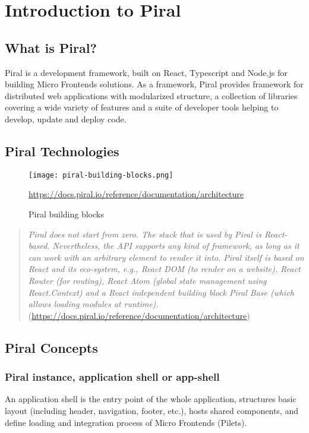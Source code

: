 \documentclass[a4paper]{book}
\begin{document}
\section{Introduction to Piral } \label{Introduction to Piral}
\subsection{What is Piral?}
Piral is a development framework, built on React, Typescript and Node.js for building Micro Frontends solutions. As a framework, Piral provides framework for distributed web applications with modularized structure, a collection of libraries covering a wide variety of features and a suite of developer tools helping to develop, update and deploy code.

\subsection{Piral Technologies}

\begin{figure}[h!]
  \centering
  \captionsetup{justification=centering}
  \texttt{[image: piral-building-blocks.png]}
  \caption{Piral building blocks}
  \url{https://docs.piral.io/reference/documentation/architecture}
  \label{fig:piral-standard}
\end{figure}

\begin{quote}
\textit{
    Piral does not start from zero. The stack that is used by Piral is React-based. Nevertheless, the API supports any kind of framework, as long as it can work with an arbitrary element to render it into. Piral itself is based on React and its eco-system, e.g., React DOM (to render on a website), React Router (for routing), React Atom (global state management using React.Context) and a React independent building block Piral Base (which allows loading modules at runtime).
}
(\url{https://docs.piral.io/reference/documentation/architecture})
\end{quote} 
\subsection{Piral Concepts}
\subsubsection{Piral instance, application shell or app-shell}

An application shell is the entry point of the whole application, structures basic layout (including header, navigation, footer, etc.), hosts shared components, and define loading and integration process of Micro Frontends (Pilets).
\end{document}
